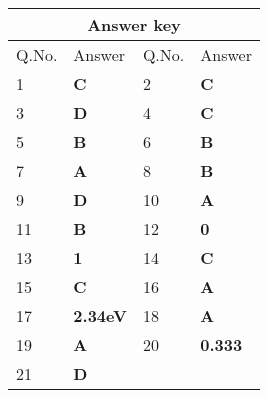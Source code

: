 \begin{table}[H]
	\centering
	\begin{tabular}{|p{1.5cm}|p{1.5cm}||p{1.5cm}|p{1.5cm}|}
		\hline
		\multicolumn{4}{|c|}{\textbf{Answer key}}\\\hline\hline
		\rowcolor{ocrel}Q.No.&Answer&Q.No.&Answer\\\hline
		1&\textbf{C} &2&\textbf{C}\\\hline 
		3&\textbf{D} &4&\textbf{C} \\\hline
		5&\textbf{B} &6&\textbf{B} \\\hline
		7&\textbf{A}&8&\textbf{B}\\\hline
		9&\textbf{D}&10&\textbf{A}\\\hline
		11&\textbf{B} &12&\textbf{0}\\\hline
		13&\textbf{1}&14&\textbf{C}\\\hline
		15&\textbf{C}&16&\textbf{A} \\\hline
		17&\textbf{2.34eV}&18&\textbf{A}\\\hline
		19&\textbf{A}&20&\textbf{0.333}\\\hline
		21&\textbf{D}&&\textbf{}\\\hline
	\end{tabular}
\end{table}